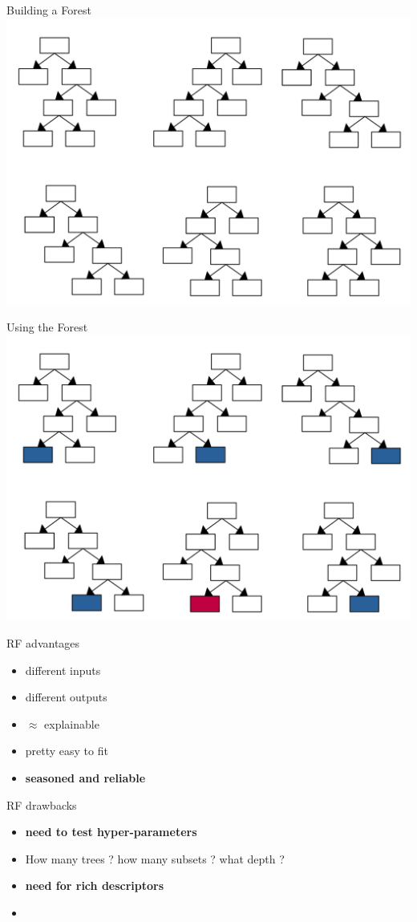\documentclass{irdbeamer}
\begin{document}
\begin{frame}{Building a Forest}
\centering
    \includegraphics[width=.7\textwidth]{./figs/schemas/entire-forest.png}%
\end{frame}

\begin{frame}{Using the Forest}
\centering
    \includegraphics[width=.7\textwidth]{./figs/schemas/entire-forest-usage.png}%
\end{frame}

\begin{frame}{RF advantages}
        \begin{itemize}
            \item<1-> different inputs
            \item<2-> different outputs
            \item<3-> $\approx$ explainable
            \item<4-> pretty easy to fit
            \item<5->[$\rightarrow$] \textbf{seasoned and reliable}
        \end{itemize}
\end{frame}

\begin{frame}{RF drawbacks}
        \begin{itemize}
            \item<1->\textbf{need to test hyper-parameters}
            \item<2->[] How many trees ? how many subsets ? what depth ? 
            \item<3->\textbf{need for rich descriptors}
            \item[] 
        \end{itemize}
\end{frame}
\end{document}
